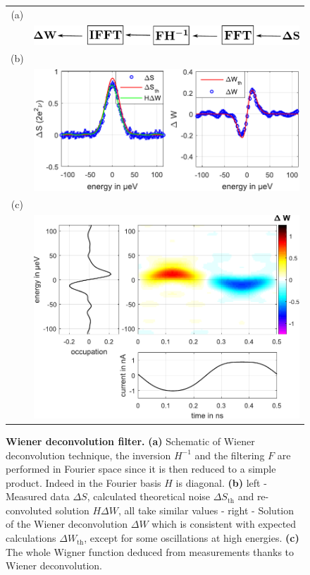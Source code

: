 \begin{figure}[hptb]
		\begin{center}
		\begin{tabular}{c c}
			(a) &  \\ 
			
			& \includegraphics[width = 8 cm]{./appA/Wiener_deconvolution} \\ 
			
			(b) &  \\ 
			
			& \includegraphics[width = 10 cm]{./appA/Wiener_results} \\
			
			(c) &  \\ 
			
			& \includegraphics[width = 10 cm]{./appA/Wiener_result_wigner}
		\end{tabular} 
	\end{center}
	\caption{\textbf{Wiener deconvolution filter.} \textbf{(a)} Schematic of Wiener deconvolution technique, the inversion $H^{-1}$ and the filtering $F$ are performed in Fourier space since it is then reduced to a simple product. Indeed in the Fourier basis $H$ is diagonal. \textbf{(b)} left - Measured data $\Delta S$, calculated theoretical noise $\Delta S_{\mathrm{th}}$ and re-convoluted solution $H\Delta W$, all take similar values - right - Solution of the Wiener deconvolution $\Delta W$ which is consistent with expected calculations $\Delta W_{\mathrm{th}}$, except for some oscillations at high energies. \textbf{(c)} The whole Wigner function deduced from measurements thanks to Wiener deconvolution.}
	\label{fig: Wiener_results}
\end{figure}

